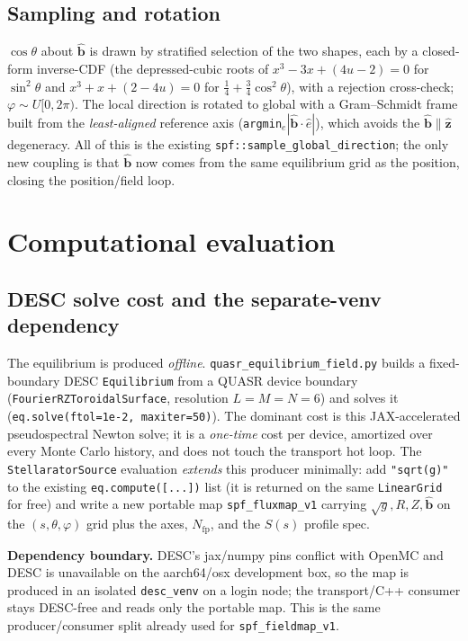\documentclass[11pt]{article}
\newcommand{\sg}{\sqrt{g}}
\newcommand{\bhat}{\hat{\mathbf{b}}}
\newcommand{\zhat}{\hat{\mathbf{z}}}
\newcommand{\Nfp}{N_{\mathrm{fp}}}
\newcommand{\code}[1]{\texttt{#1}}
\begin{document}
\subsection{Sampling and rotation}

$\cos\theta$ about $\bhat$ is drawn by stratified selection of the two shapes, each by
a closed-form inverse-CDF (the depressed-cubic roots of $x^3-3x+(4u-2)=0$ for
$\sin^2\theta$ and $x^3+x+(2-4u)=0$ for $\tfrac14+\tfrac34\cos^2\theta$), with a
rejection cross-check; $\varphi\sim U[0,2\pi)$. The local direction is rotated to
global with a Gram--Schmidt frame built from the \emph{least-aligned} reference axis
(\code{argmin}$_e|\bhat\cdot\hat e|$), which avoids the $\bhat\parallel\zhat$
degeneracy. All of this is the existing \code{spf::sample\_global\_direction}; the
only new coupling is that $\bhat$ now comes from the same equilibrium grid as the
position, closing the position/field loop.

\section{Computational evaluation}
\label{sec:compute}

\subsection{DESC solve cost and the separate-venv dependency}

The equilibrium is produced \emph{offline}. \code{quasr\_equilibrium\_field.py} builds
a fixed-boundary DESC \code{Equilibrium} from a QUASR device boundary
(\code{FourierRZToroidalSurface}, resolution $L{=}M{=}N{=}6$) and solves it
(\code{eq.solve(ftol=1e-2, maxiter=50)}). The dominant cost is this JAX-accelerated
pseudospectral Newton solve; it is a \emph{one-time} cost per device, amortized over
every Monte Carlo history, and does not touch the transport hot loop. The
\code{StellaratorSource} evaluation \emph{extends} this producer minimally: add
\code{"sqrt(g)"} to the existing \code{eq.compute([...])} list (it is returned on the
same \code{LinearGrid} for free) and write a new portable map \code{spf\_fluxmap\_v1}
carrying $\sg,R,Z,\bhat$ on the $(s,\theta,\varphi)$ grid plus the axes, $\Nfp$, and
the $S(s)$ profile spec.

\textbf{Dependency boundary.} DESC's jax/numpy pins conflict with OpenMC and DESC is
unavailable on the aarch64/osx development box, so the map is produced in an isolated
\code{desc\_venv} on a login node; the transport/C++ consumer stays DESC-free and reads
only the portable map. This is the same producer/consumer split already used for
\code{spf\_fieldmap\_v1}.
\end{document}
